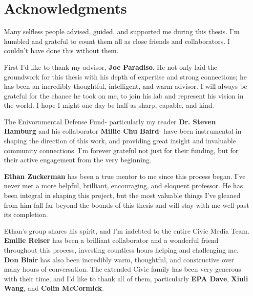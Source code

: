 % 

\cleardoublepage


\readerpage

\cleardoublepage

\section*{Acknowledgments}

Many selfless people advised, guided, and supported me during this thesis.  I'm humbled and grateful to count them all as close friends and collaborators.  I couldn't have done this without them.

First I'd like to thank my advisor, \textbf{Joe Paradiso}.  He not only laid the groundwork for this thesis with his depth of expertise and strong connections; he has been an incredibly thoughtful, intelligent, and warm advisor.  I will always be grateful for the chance he took on me, to join his lab and represent his vision in the world.  I hope I might one day be half as sharp, capable, and kind.

The Enivornmental Defense Fund- particularly my reader \textbf{Dr. Steven Hamburg} and his collaborator \textbf{Millie Chu Baird}- have been instrumental in shaping the direction of this work, and providing great insight and invaluable community connections.  I'm forever grateful not just for their funding, but for their active engagement from the very beginning.

\textbf{Ethan Zuckerman} has been a true mentor to me since this process began.  I've never met a more helpful, brilliant, encouraging, and eloquent professor.  He has been integral in shaping this project, but the most valuable things I've gleaned from him fall far beyond the bounds of this thesis and will stay with me well past its completion.  

Ethan's group shares his spirit, and I'm indebted to the entire Civic Media Team.  \textbf{Emilie Reiser} has been a brilliant collaborator and a wonderful friend throughout this process, investing countless hours helping and challenging me.  \textbf{Don Blair} has also been incredibly warm, thoughtful, and constructive over many hours of conversation.  The extended Civic family has been very generous with their time, and I'd like to thank all of them, particularly \textbf{EPA Dave}, \textbf{Xiuli Wang}, and \textbf{Colin McCormick}.

